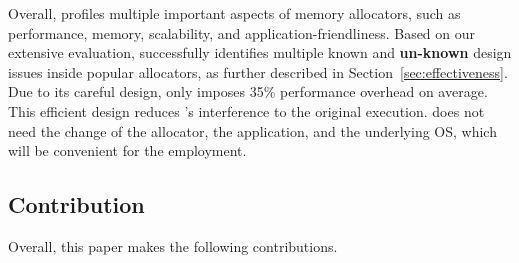 
Overall, \MP{} profiles multiple important aspects of memory allocators, such as performance, memory, scalability, and application-friendliness. Based on our extensive evaluation, \MP{} successfully identifies multiple known and \textbf{un-known} design issues inside popular allocators, as further described in Section~\ref{sec:effectiveness}. Due to its careful design, \MP{} only imposes 35\% performance overhead on average. This efficient design reduces \MP{}'s interference to the original execution. \MP{} does not need the change of the allocator, the application, and the underlying OS, which will be convenient for the employment. 


\subsection*{Contribution}

Overall, this paper makes the following contributions. 

